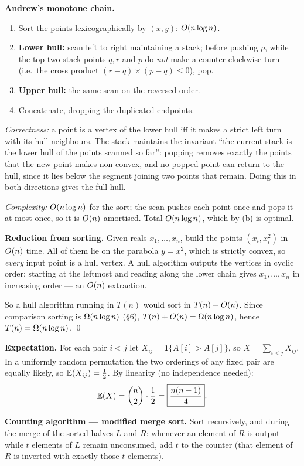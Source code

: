  \textbf{Andrew's monotone chain.}
\begin{enumerate}
  \item Sort the points lexicographically by $(x,y)$: $O(n\log n)$.
  \item \textbf{Lower hull:} scan left to right maintaining a stack; before pushing $p$, while the
        top two stack points $q,r$ and $p$ do \emph{not} make a counter-clockwise turn (i.e.\
        the cross product $(r-q)\times(p-q)\le0$), pop.
  \item \textbf{Upper hull:} the same scan on the reversed order.
  \item Concatenate, dropping the duplicated endpoints.
\end{enumerate}
\emph{Correctness:} a point is a vertex of the lower hull iff it makes a strict left turn with its
hull-neighbours. The stack maintains the invariant ``the current stack is the lower hull of the
points scanned so far'': popping removes exactly the points that the new point makes non-convex,
and no popped point can return to the hull, since it lies below the segment joining two points
that remain. Doing this in both directions gives the full hull.

\emph{Complexity:} $O(n\log n)$ for the sort; the scan pushes each point once and pops it at
most once, so it is $O(n)$ amortised. Total $O(n\log n)$, which by (b) is optimal.

 \textbf{Reduction from sorting.} Given reals $x_1,\dots,x_n$, build the points
$(x_i,x_i^2)$ in $O(n)$ time. All of them lie on the parabola $y=x^2$, which is strictly convex,
so \emph{every} input point is a hull vertex. A hull algorithm outputs the vertices in cyclic
order; starting at the leftmost and reading along the lower chain gives $x_1,\dots,x_n$ in
increasing order --- an $O(n)$ extraction.

So a hull algorithm running in $T(n)$ would sort in $T(n)+O(n)$. Since comparison sorting is
$\Omega(n\log n)$ (\S6), $T(n)+O(n)=\Omega(n\log n)$, hence $T(n)=\Omega(n\log n)$. \qed

 \textbf{Expectation.} For each pair $i<j$ let $X_{ij}=\mathbf 1\{A[i]>A[j]\}$, so
$X=\sum_{i<j}X_{ij}$. In a uniformly random permutation the two orderings of any fixed pair are
equally likely, so $\mathbb{E}(X_{ij})=\tfrac12$. By linearity (no independence needed):
\[
  \mathbb{E}(X)=\binom n2\cdot\frac12=\boxed{\frac{n(n-1)}{4}} .
\]

\textbf{Counting algorithm --- modified merge sort.} Sort recursively, and during the merge of
the sorted halves $L$ and $R$: whenever an element of $R$ is output while $t$ elements of $L$
remain unconsumed, add $t$ to the counter (that element of $R$ is inverted with exactly those $t$
elements).

